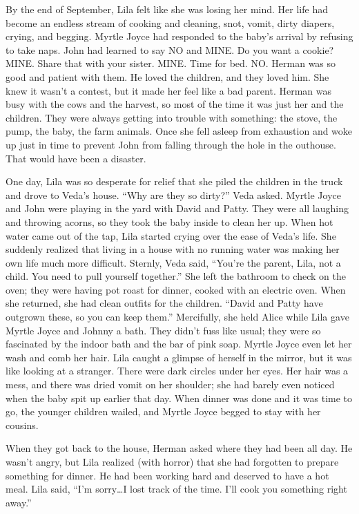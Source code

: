\documentclass[
  american,
  letterpaper,
]{book}
\begin{document}
By the end of September, Lila felt like she was losing her mind. Her
life had become an endless stream of cooking and cleaning, snot, vomit,
dirty diapers, crying, and begging. Myrtle Joyce had responded to the
baby's arrival by refusing to take naps. John had learned to say NO and
MINE. Do you want a cookie? MINE. Share that with your sister. MINE.
Time for bed. NO. Herman was so good and patient with them. He loved the
children, and they loved him. She knew it wasn't a contest, but it made
her feel like a bad parent. Herman was busy with the cows and the
harvest, so most of the time it was just her and the children. They were
always getting into trouble with something: the stove, the pump, the
baby, the farm animals. Once she fell asleep from exhaustion and woke up
just in time to prevent John from falling through the hole in the
outhouse. That would have been a disaster.

One day, Lila was so desperate for relief that she piled the children in
the truck and drove to Veda's house. ``Why are they so dirty?'' Veda
asked. Myrtle Joyce and John were playing in the yard with David and
Patty. They were all laughing and throwing acorns, so they took the baby
inside to clean her up. When hot water came out of the tap, Lila started
crying over the ease of Veda's life. She suddenly realized that living
in a house with no running water was making her own life much more
difficult. Sternly, Veda said, ``You're the parent, Lila, not a child.
You need to pull yourself together.'' She left the bathroom to check on
the oven; they were having pot roast for dinner, cooked with an electric
oven. When she returned, she had clean outfits for the children. ``David
and Patty have outgrown these, so you can keep them.'' Mercifully, she
held Alice while Lila gave Myrtle Joyce and Johnny a bath. They didn't
fuss like usual; they were so fascinated by the indoor bath and the bar
of pink soap. Myrtle Joyce even let her wash and comb her hair. Lila
caught a glimpse of herself in the mirror, but it was like looking at a
stranger. There were dark circles under her eyes. Her hair was a mess,
and there was dried vomit on her shoulder; she had barely even noticed
when the baby spit up earlier that day. When dinner was done and it was
time to go, the younger children wailed, and Myrtle Joyce begged to stay
with her cousins.

When they got back to the house, Herman asked where they had been all
day. He wasn't angry, but Lila realized (with horror) that she had
forgotten to prepare something for dinner. He had been working hard and
deserved to have a hot meal. Lila said, ``I'm sorry\ldots I lost track
of the time. I'll cook you something right away.''
\end{document}
